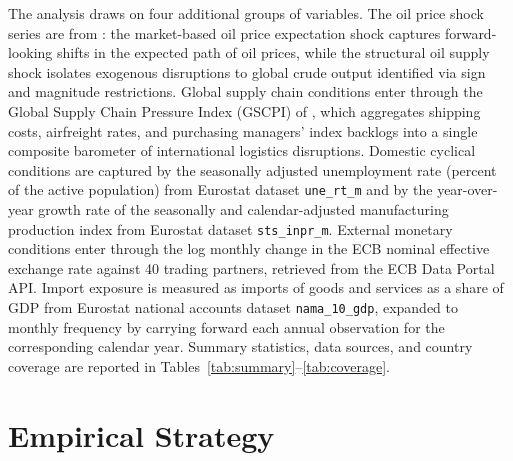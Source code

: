 \documentclass[a4paper,12pt]{article}
\begin{document}
The analysis draws on four additional groups of variables. The oil price shock series are from : the market-based oil price expectation shock captures forward-looking shifts in the expected path of oil prices, while the structural oil supply shock isolates exogenous disruptions to global crude output identified via sign and magnitude restrictions. Global supply chain conditions enter through the Global Supply Chain Pressure Index (GSCPI) of , which aggregates shipping costs, airfreight rates, and purchasing managers' index backlogs into a single composite barometer of international logistics disruptions. Domestic cyclical conditions are captured by the seasonally adjusted unemployment rate (percent of the active population) from Eurostat dataset \texttt{une\_rt\_m} and by the year-over-year growth rate of the seasonally and calendar-adjusted manufacturing production index from Eurostat dataset \texttt{sts\_inpr\_m}. External monetary conditions enter through the log monthly change in the ECB nominal effective exchange rate against 40 trading partners, retrieved from the ECB Data Portal API. Import exposure is measured as imports of goods and services as a share of GDP from Eurostat national accounts dataset \texttt{nama\_10\_gdp}, expanded to monthly frequency by carrying forward each annual observation for the corresponding calendar year. Summary statistics, data sources, and country coverage are reported in Tables~\ref{tab:summary}--\ref{tab:coverage}.


\section{Empirical Strategy}\label{sec:strategy}
\end{document}

